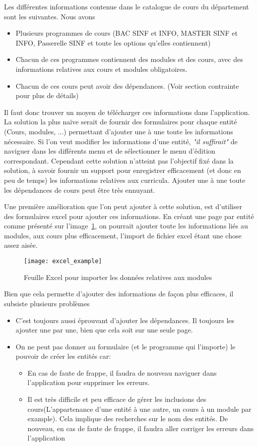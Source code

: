 Les différentes informations contenue dans le catalogue de cours du département sont les suivantes. Nous avons
\begin{itemize}
\item Plusieurs programmes de cours (BAC SINF et INFO, MASTER SINF et INFO, Passerelle SINF et toute les options qu'elles contiennent)
\item Chacun de ces programmes contiennent des modules et des cours, avec des informations relatives aux cours et modules obligatoires.
\item Chacun de ces cours peut avoir des dépendances. (Voir section contrainte pour plus de détails)
\end{itemize}

Il faut donc trouver un moyen de télécharger ces informations dans l'application. La solution la plus naïve serait de fournir des formulaires pour chaque entité (Cours, modules, ...) permettant d'ajouter une à une toute les informations nécessaire. Si l'on veut modifier les informations d'une entité, \textit{"il suffirait"} de naviguer dans les différents menu et de sélectionner le menu d'édition correspondant. Cependant cette solution n'atteint pas l'objectif fixé dans la solution, à savoir fournir un support pour enregistrer efficacement (et donc en peu de temps) les informations relatives aux curricula. Ajouter une à une toute les dépendances de cours peut être très ennuyant. 

Une première amélioration que l'on peut ajouter à cette solution, est d'utiliser des formulaires excel pour ajouter ces informations. En créant une page par entité comme présenté sur l'image~\ref{fig:excel_example}, on pourrait ajouter toute les informations liés au modules, aux cours plus efficacement, l'import de fichier excel étant une chose assez aisée. 
\begin{figure}[H]
\centering
\caption{Feuille Excel pour importer les données relatives aux modules}
\label{fig:excel_example}
\texttt{[image: excel\_example]}
\end{figure} 

Bien que cela permette d'ajouter des informations de façon plus efficaces, il subsiste plusieurs problèmes
\begin{itemize}
\item C'est toujours aussi éprouvant d'ajouter les dépendances. Il toujours les ajouter une par une, bien que cela soit sur une seule page.
\item On ne peut pas donner au formulaire (et le programme qui l'importe) le pouvoir de créer les entités car:
\begin{itemize}
  \item En cas de faute de frappe, il faudra de nouveau naviguer dans l'application pour supprimer les erreurs.
  \item Il est très difficile et peu efficace de gérer les inclusions des cours(L'appartenance d'une entité à une autre, un cours à un module par example). Cela implique des recherches sur le nom des entités. De nouveau, en cas de faute de frappe, il faudra aller corriger les erreurs dans l'application
\end{itemize}
\end{itemize}

